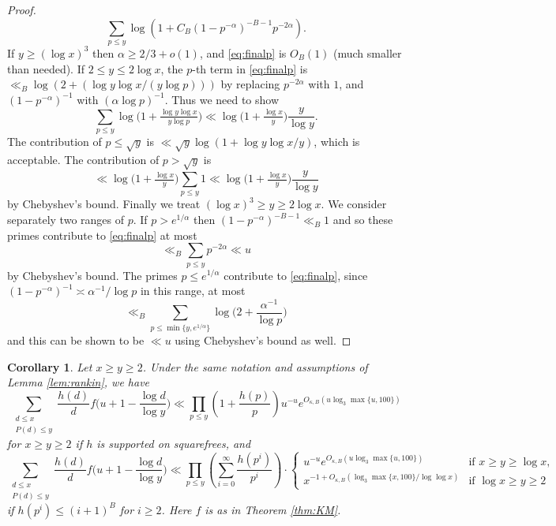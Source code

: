 \documentclass{article}
\theoremstyle{plain}
\newtheorem{cor}[thm]{Corollary}
\theoremstyle{remark}
\numberwithin{equation}{section}
\begin{document}
\begin{proof}
	\begin{equation}\label{eq:finalp}
		\sum_{p\le y} \log (1+C_B(1-p^{-\alpha})^{-B-1}p^{-2\alpha}).
	\end{equation}
	If $y\ge (\log x)^3$ then $\alpha \ge 2/3+o(1)$, and \eqref{eq:finalp} is $O_B(1)$ (much smaller than needed). If $2 \le y \le 2\log x$, the $p$-th term in \eqref{eq:finalp} is $\ll_B \log(2+ (\log y \log x/(y \log p)))$ by replacing $p^{-2\alpha}$ with $1$, and $(1-p^{-\alpha})^{-1}$ with $(\alpha\log p)^{-1}$. Thus we need to show
	\[ \sum_{p\le y} \log\big(1  +\tfrac{\log y \log x}{y \log p}\big) \ll \log\big(1+\tfrac{\log x}{y}\big)\frac{y}{\log y}.\]
	The contribution of $p\le \sqrt{y}$ is $\ll \sqrt{y}\log(1+\log y\log x/y)$, which is acceptable. The contribution of $p>\sqrt{y}$ is 
	\[ \ll   \log\big(1 + \tfrac{\log x}{y}\big) \sum_{p\le y} 1\ll \log\big(1+\tfrac{\log x}{y}\big)\frac{y}{\log y}\]
	by Chebyshev's bound. Finally we treat $(\log x)^3 \ge y \ge 2\log x$. We consider separately two ranges of $p$. If $p> e^{1/\alpha}$ then $(1-p^{-\alpha})^{-B-1} \ll_B 1$ and so these primes contribute to \eqref{eq:finalp} at most
	\[ \ll_B \sum_{p\le y} p^{-2\alpha} \ll u\]
	by Chebyshev's bound. The primes $p\le e^{1/\alpha}$ contribute to \eqref{eq:finalp}, since $(1-p^{-\alpha})^{-1} \asymp \alpha^{-1}/\log p$ in this range, at most
	\[ \ll_B \sum_{p\le \min\{y,e^{1/\alpha}\}} \log\big( 2 + \frac{\alpha^{-1}}{\log p}\big)\]
	and this can be shown to be $\ll u$ using Chebyshev's bound as well.
\end{proof}
\begin{cor}\label{cor:rankin}
	Let $x\ge y\ge 2$. Under the same notation and assumptions of Lemma \ref{lem:rankin}, we have
	\[ \sum_{\substack{d\le x\\ P(d)\le y}} \frac{h(d)}{d}f\big( u+1 - \frac{\log d}{\log y}\big)\ll \prod_{p\le y}\left(1+\frac{h(p)}{p}\right) u^{-u}e^{O_{\kappa,B}(u\log_3 \max\{u,100\})}\]
for $x\ge y \ge 2$	if $h$ is supported on squarefrees, and 
	\[ \sum_{\substack{d\le x\\ P(d)\le y}} \frac{h(d)}{d}f\big( u+1 - \frac{\log d}{\log y}\big)\ll\prod_{p\le y}\left(\sum_{i=0}^{\infty}\frac{h(p^i)}{p^i}\right) \cdot \begin{cases} u^{-u}e^{O_{\kappa,B}(u\log_3 \max\{u,100\})} &\text{if }x\ge y \ge \log x, \\ x^{-1+O_{\kappa,B}(\log_3 \max\{x,100\} / \log \log x)} &\text{if }\log x \ge y \ge 2\end{cases}\]
	if $h(p^i)\le (i+1)^B$ for $i\ge 2$. Here $f$ is as in Theorem \ref{thm:KM}.
\end{cor}
\end{document}
